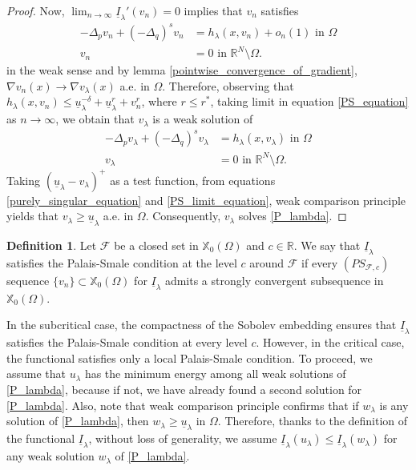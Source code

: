 \documentclass[reqno,oneside]{amsart}
\theoremstyle{definition}
\newtheorem{definition}[theorem]{Definition}
\theoremstyle{remark}
\numberwithin{equation}{section}
\newcommand{\Om} {\Omega}
\newcommand{\sr}{\mathbb{R}}
\newcommand{\p}{\Delta_p}
\newcommand{\qs}{(-\Delta_q)^s}
\newcommand{\bdry}{\mathbb{R}^N \setminus \Omega}
\newcommand{\rar}{\rightarrow}
\newcommand{\na} {\nabla}
\newcommand{\xo}{\mathbb{X}_0}
\newcommand{\ul}{\underline{u}}
\newcommand{\ti}{\underline{I}_{\la}}
\newcommand{\il}{\underline{I}}
\newcommand{\la} {\lambda}
\begin{document}
\begin{proof}
    Now, $\lim_{n\rar\infty} \ti' (v_n) =0$ implies that $v_n$ satisfies
    \begin{equation}\label{PS_equation}
        \begin{aligned}
            -\p v_n + \qs v_n &= h_{\la} (x, v_n) + o_n (1) \text{ in } \Om\\
            v_n &= 0 \text{ in } \bdry.
        \end{aligned}
    \end{equation}
    in the weak sense and by lemma \ref{pointwise_convergence_of_gradient}, $\na v_n (x) \rar \na v_{\la} (x)$ a.e. in $\Om$. Therefore, observing that $\displaystyle h_{\la} \left(x, v_n \right) \leq \ul_{\la}^{-\delta} + \ul_{\la}^r + v_n^r$, where $r\leq r^*$, taking limit in equation \eqref{PS_equation} as $n\rar \infty$, we obtain that $v_{\la}$ is a weak solution of
    \begin{equation}\label{PS_limit_equation}
        \begin{aligned}
            -\p v_{\la} + \qs v_{\la} &= h_{\la} (x, v_{\la}) \text{ in } \Om\\
            v_{\la} &= 0 \text{ in } \bdry.
        \end{aligned}
    \end{equation}
    Taking $(\underline{u}_{\la} -v_{\la})^+$ as a test function, from equations \eqref{purely_singular_equation} and \eqref{PS_limit_equation}, weak comparison principle yields that $v_{\la} \geq \underline{u}_{\la}$ a.e. in $\Om$. Consequently, $v_{\la}$ solves \eqref{P_lambda}.
\end{proof}

\begin{definition}
    Let $\mathcal{F}$ be a closed set in $\xo(\Om)$ and $c\in\sr$. We say that $\ti$ satisfies the Palais-Smale condition at the level $c$ around $\mathcal{F}$ if every $(PS_{\mathcal{F}, c})$ sequence $\{v_n\} \subset \xo(\Om)$ for $\ti$ admits a strongly convergent subsequence in $\xo(\Om)$.
\end{definition}

In the subcritical case, the compactness of the Sobolev embedding ensures that $\ti$ satisfies the Palais-Smale condition at every level $c$. However, in the critical case, the functional satisfies only a local Palais-Smale condition. To proceed, we assume that $u_{\la}$ has the minimum energy among all weak solutions of \eqref{P_lambda}, because if not, we have already found a second solution for \eqref{P_lambda}. Also, note that weak comparison principle confirms that if $w_{\la}$ is any solution of \eqref{P_lambda}, then $w_{\la} \geq \ul_{\la}$ in $\Om$. Therefore, thanks to the definition of the functional $\il_{\la}$, without loss of generality, we assume $\il_{\la} (u_{\la}) \leq \il_{\la} (w_{\la})$ for any weak solution $w_{\la}$ of \eqref{P_lambda}.
\end{document}
